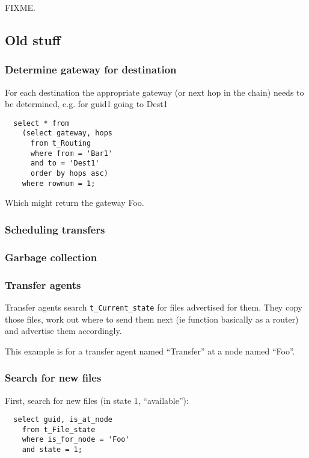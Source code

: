 \documentclass{cmspaper}
\begin{document}
FIXME.


\subsection{Old stuff}
\subsubsection{Determine gateway for destination}
For each destination the appropriate gateway (or next hop in the chain) needs to be determined, e.g. for guid1 going to Dest1

{\small\begin{verbatim}
  select * from
    (select gateway, hops
      from t_Routing
      where from = 'Bar1'
      and to = 'Dest1'
      order by hops asc)
    where rownum = 1;
\end{verbatim}}

Which might return the gateway Foo. 

\subsubsection{Scheduling transfers}

\subsubsection{Garbage collection}

\subsubsection{Transfer agents}

Transfer agents search \texttt{t\_Current\_state} for files advertised for them.  They copy those files, work out where to send them next (ie function basically as a router) and advertise them accordingly. 

This example is for a transfer agent named ``Transfer'' at a node named ``Foo''.

\subsubsection{Search for new files}
First, search for new files (in state 1, ``available''):

{\small\begin{verbatim}
  select guid, is_at_node
    from t_File_state
    where is_for_node = 'Foo'
    and state = 1;
\end{verbatim}}
\end{document}
